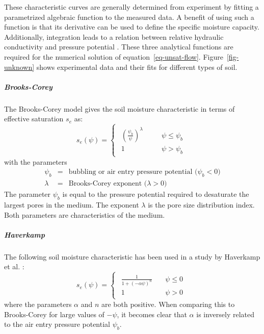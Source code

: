 \documentclass[fleqn]{article}
\begin{document}
These characteristic curves are generally determined from experiment 
by fitting a parametrized algebraic function to the measured data. 
A benefit of using such a function is that its derivative can be used 
to define the specific moisture capacity. Additionally, integration 
leads to a relation between relative hydraulic conductivity and pressure 
potential \cite{???}. These three analytical functions are required for 
the numerical solution of equation~\ref{eq-unsat-flow}. 
Figure~\ref{fig-unknown} shows experimental data and their fits
for different types of soil.

\subparagraph{Brooks-Corey}
The Brooks-Corey model \cite{brookscorey1966} gives the soil
moisture characteristic in terms of effective saturation $s_e$ as:
\begin{equation}
  s_e(\psi)  =
  \begin{cases}
    \begin{aligned}
      \left( \frac{\psi_b}{\psi} \right)^{\lambda} & \quad & \psi \leq \psi_b \\
      1                                            & \quad & \psi > \psi_b
    \end{aligned}
  \end{cases}
  \label{eq-seff-BrooksCorey}
\end{equation}
with the parameters
\begin{eqnarray*}
  \psi_b  &=& \text{bubbling or air entry pressure potential ($\psi_b < 0$)}\\
  \lambda &=& \text{Brooks-Corey exponent ($\lambda>0$)}
\end{eqnarray*}
The parameter $\psi_b$ is equal to the pressure potential required 
to desaturate the largest pores in the medium. The exponent $\lambda$
is the pore size distribution index. Both parameters are characteristics
of the medium.

\subparagraph{Haverkamp}
The following soil moisture characteristic has been used in a study by
Haverkamp et al. \cite{haverkampetal-1977}:
\begin{equation}
  s_e(\psi)  =
  \begin{cases}
    \begin{aligned}
      \frac{1}
      {
        1 + \left( -\alpha\psi \right)^{n}
      } \quad & \psi \leq 0 \\
      1 \quad & \psi > 0
    \end{aligned}
  \end{cases}
  \label{eq-seff-Haverkamp}
\end{equation}
where the parameters $\alpha$ and $n$ are both positive. 
When comparing this to Brooks-Corey for large values of $-\psi$,
it becomes clear that $\alpha$ is inversely related to the air entry 
pressure potential $\psi_b$.
\end{document}
